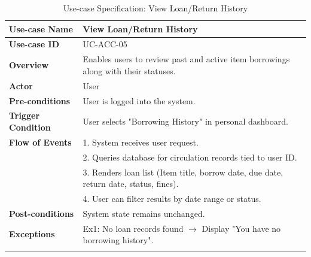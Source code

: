 \begin{longtable}{|p{3.5cm}|p{11.5cm}|}
    \hline
    \textbf{Use-case Name} & \textbf{View Loan/Return History} \\
    \hline
    \textbf{Use-case ID} & UC-ACC-05 \\
    \hline
    \textbf{Overview} & Enables users to review past and active item borrowings along with their statuses. \\
    \hline
    \textbf{Actor} & User \\
    \hline
    \textbf{Pre-conditions} & User is logged into the system. \\
    \hline
    \textbf{Trigger Condition} & User selects "Borrowing History" in personal dashboard. \\
    \hline
    \textbf{Flow of Events} & 
    1. System receives user request.\\ 
 & 
    2. Queries database for circulation records tied to user ID.\\ 
 & 
    3. Renders loan list (Item title, borrow date, due date, return date, status, fines).\\ 
 & 
    4. User can filter results by date range or status. \\
    \hline
    \textbf{Post-conditions} & System state remains unchanged. \\
    \hline
    \textbf{Exceptions} & 
    Ex1: No loan records found $\rightarrow$ Display "You have no borrowing history". \\
    \hline
    \caption{Use-case Specification: View Loan/Return History} \\
\end{longtable}


